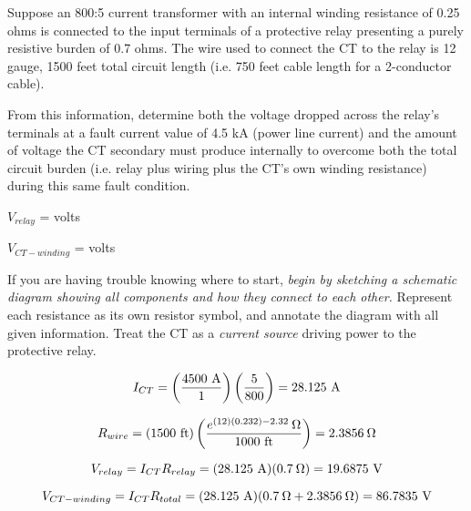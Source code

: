 

Suppose an 800:5 current transformer with an internal winding resistance of 0.25 ohms is connected to the input terminals of a protective relay presenting a purely resistive burden of 0.7 ohms.  The wire used to connect the CT to the relay is 12 gauge, 1500 feet total circuit length (i.e. 750 feet cable length for a 2-conductor cable).  

\vskip 10pt

From this information, determine both the voltage dropped across the relay's terminals at a fault current value of 4.5 kA (power line current) and the amount of voltage the CT secondary must produce internally to overcome both the total circuit burden (i.e. relay plus wiring plus the CT's own winding resistance) during this same fault condition.

\vskip 10pt

$V_{relay}$ = \underbar{\hskip 50pt} volts

\vskip 10pt

$V_{CT-winding}$ = \underbar{\hskip 50pt} volts

\vskip 10pt







If you are having trouble knowing where to start, {\it begin by sketching a schematic diagram showing all components and how they connect to each other.}  Represent each resistance as its own resistor symbol, and annotate the diagram with all given information.  Treat the CT as a {\it current source} driving power to the protective relay.
 






$$I_{CT} = \left({4500 \hbox{ A} \over 1} \right) \left({5 \over 800} \right) = 28.125 \hbox{ A}$$

$$R_{wire} = (1500 \hbox{ ft}) \left( {e^{(12)(0.232) - 2.32} \> \Omega} \over 1000 \hbox{ ft} \right) = 2.3856 \> \Omega$$

$$V_{relay} = I_{CT} R_{relay} = (28.125 \hbox{ A})(0.7 \> \Omega) = 19.6875 \hbox{ V}$$

$$V_{CT-winding} = I_{CT} R_{total} = (28.125 \hbox{ A})(0.7 \> \Omega + 2.3856 \> \Omega) = 86.7835 \hbox{ V}$$




